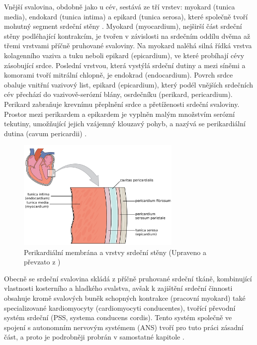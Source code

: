 Vnější svalovina, obdobně jako u cév, sestává ze tří vrstev: myokard (tunica
media), endokard (tunica intima) a epikard (tunica serosa), které společně tvoří
mohutný segment srdeční stěny \cite{Memorix2017}. Myokard (myocardium), nejširší
část srdeční stěny podléhající kontrakcím, je tvořen v závislosti na srdečním
oddílu dvěma až třemi vrstvami příčně pruhované svaloviny. Na myokard naléhá
silná řídká vrstva kolagenního vaziva a tuku neboli epikard (epicardium), ve
které probíhají cévy zásobující srdce. Poslední vrstvou, která vystýlá srdeční
dutiny a mezi síněmi a komorami tvoří mitrální chlopně, je endokrad
(endocardium). Povrch srdce obaluje vnitřní vazivový list, epikard (epicardium),
který podél vnějších srdečních cév přechází do vazivově-serózní blány,
osrdečníku (perikard, pericardium). Perikard zabraňuje krevnímu přeplnění srdce
a přetíženosti srdeční svaloviny. Prostor mezi perikardem a epikardem je vyplněn
malým množstvím serózní tekutiny, umožňující jejich vzájemný klouzavý pohyb, a
nazývá se perikardiální dutina (cavum pericardii)
\cite{Weinhaus2005,Dylevsky2013}.

\begin{figure}[h]
	\begin{center}
		\includegraphics[width=0.7\textwidth]{../assets/anatomy/heart_muscle}
		\caption{Perikardiální membrána a vrstvy srdeční stěny (Upraveno a
			převzato z \cite{OpenStax})}
		\label{fig:heartlayers}
	\end{center}
\end{figure}

Obecně se srdeční svalovina skládá z příčně pruhované srdeční tkáně, kombinující
vlastnosti kosterního a hladkého svalstva, avšak k zajištění srdeční činnosti
obsahuje kromě svalových buněk schopných kontrakce (pracovní myokard) také
specializované kardiomyocyty (cardiomyocyti conducentes), tvořící převodní
systém srdeční (PSS, systema conducens cordis). Tento systém společně ve spojení
s autonomním nervovým systémem (ANS) tvoří pro tuto práci zásadní část, a proto
je podrobněji probrán v samostatné kapitole \cite{Memorix2017,Dylevsky2013}.

